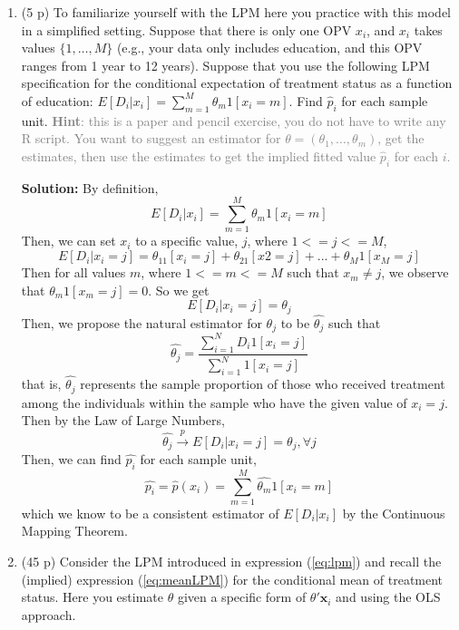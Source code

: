 \documentclass[
]{article}
\begin{document}
\begin{enumerate}
\def\labelenumi{\arabic{enumi}.}
\item
  (5 p) To familiarize yourself with the LPM here you practice with this
  model in a simplified setting. Suppose that there is only one OPV
  \(x_i\), and \(x_i\) takes values \(\{1,\ldots,M\}\) (e.g., your data
  only includes education, and this OPV ranges from 1 year to 12 years).
  Suppose that you use the following LPM specification for the
  conditional expectation of treatment status as a function of
  education: \(E[D_i|x_i]=\sum_{m=1}^{M}\theta_m1[x_i=m]\). Find
  \(\hat{p}_i\) for each sample unit.
  \textcolor{gray}{\textbf{Hint}: this is a paper and pencil exercise, you do not have to write any R script. You want to suggest an estimator for $\theta=(\theta_1,\ldots,\theta_m)$, get the estimates, then use the estimates to get the implied fitted value $\hat{p}_i$ for each $i$.}

  \textbf{Solution:} By definition,
  \[ E[D_i | x_i] = \sum_{m=1}^M \theta_m1[x_i=m]\] Then, we can set
  \(x_i\) to a specific value, \(j\), where \(1 <= j <= M\),
  \[ E[D_i | x_i = j] = \theta_11[x_i = j] + \theta_21[x2 = j] + ... + \theta_M1[x_M = j] \]
  Then for all values \(m\), where \(1 <= m <= M\) such that
  \(x_m \neq j\), we observe that \(\theta_m1[x_m = j] = 0\). So we get
  \[ E[D_i | x_i = j] = \theta_j \] Then, we propose the natural
  estimator for \(\theta_j\) to be \(\hat{\theta_j}\) such that
  \[ \hat{\theta_j} = \frac{\sum_{i=1}^N D_i1[x_i = j]}{\sum_{i=1}^N1[x_i = j]}\]
  that is, \(\hat{\theta_j}\) represents the sample proportion of those
  who received treatment among the individuals within the sample who
  have the given value of \(x_i = j\). Then by the Law of Large Numbers,
  \[ \hat{\theta_j} \xrightarrow{p} E[D_i | x_i = j] = \theta_j, \forall j\]
  Then, we can find \(\hat{p_i}\) for each sample unit,
  \[ \hat{p_i} = \hat{p}(x_i) = \sum_{m=1}^M \hat{\theta_m}1[x_i = m] \]
  which we know to be a consistent estimator of \(E[D_i|x_i]\) by the
  Continuous Mapping Theorem.
\item
  (45 p) Consider the LPM introduced in expression (\ref{eq:lpm}) and
  recall the (implied) expression (\ref{eq:meanLPM}) for the conditional
  mean of treatment status. Here you estimate \(\theta\) given a
  specific form of \(\theta'\mathbf{x}_{i}\) and using the OLS
  approach.\label{item:lpm:ols}


\end{enumerate}
\end{document}
